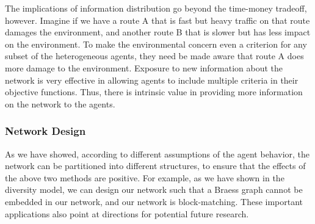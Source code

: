 The implications of information distribution go beyond the time-money tradeoff, however. Imagine if we have a route A that is fast but heavy traffic on that route damages the environment, and another route B that is slower but has less impact on the environment. To make the environmental concern even a criterion for any subset of the heterogeneous agents, they need be made aware that route A does more damage to the environment. Exposure to new information about the network is very effective in allowing agents to include multiple criteria in their objective functions. Thus, there is intrinsic value in providing more information on the network to the agents.

\subsubsection{Network Design}

As we have showed, according to different assumptions of the agent behavior, the network can be partitioned into different structures, to ensure that the effects of the above two methods are positive. For example, as we have shown in the diversity model, we can design our network such that a Braess graph cannot be embedded in our network, and our network is block-matching.
These important applications also point at directions for potential future research. 

